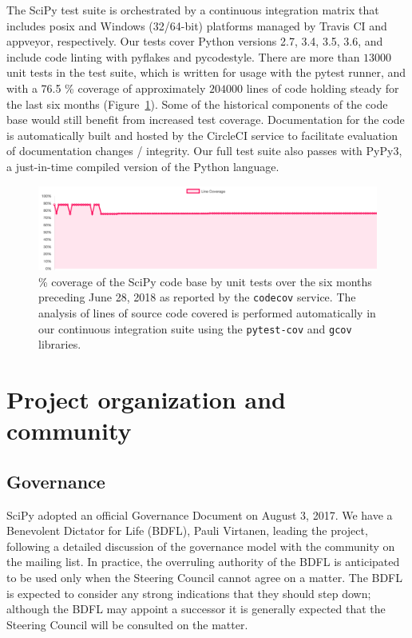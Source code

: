 \documentclass[fleqn,10pt]{wlscirep}
\begin{document}
The SciPy test suite is orchestrated by a continuous integration matrix that
includes posix and Windows (32/64-bit) platforms managed by Travis CI and
appveyor, respectively. Our tests cover Python versions 2.7, 3.4, 3.5, 3.6, and
include code linting with pyflakes and pycodestyle. There are more than $13000$
unit tests in the test suite, which is written for usage with the pytest
runner, and with a 76.5 \% coverage of approximately $204000$ lines of code
holding steady for the last six months (Figure~\ref{fig:coverage}).  Some of
the historical components of the code base would still benefit from increased
test coverage. Documentation for the code is automatically built and hosted by
the CircleCI service to facilitate evaluation of documentation changes /
integrity.  Our full test suite also passes with PyPy3, a just-in-time compiled
version of the Python language.

\begin{figure}[H]
\centering
\includegraphics[width=\textwidth]{static/coverage-chart}
\caption{\% coverage of the SciPy code base by unit tests over the six months
preceding June 28, 2018 as reported by the \texttt{codecov} service. The
analysis of lines of source code covered is performed automatically in our
continuous integration suite using the \texttt{pytest-cov} and \texttt{gcov}
libraries.}
\label{fig:coverage}
\end{figure}


\section*{Project organization and community}

\subsection*{Governance}

SciPy adopted an official Governance Document on August 3,
2017\cite{SciPyProjectGovernance}.  We have a Benevolent Dictator for Life
(BDFL), Pauli Virtanen, leading the project, following a detailed discussion of
the governance model with the community on the mailing list.  In practice, the
overruling authority of the BDFL is anticipated to be used only when the
Steering Council cannot agree on a matter.  The BDFL is expected to consider
any strong indications that they should step down; although the BDFL may
appoint a successor it is generally expected that the Steering Council will be
consulted on the matter.
\end{document}
